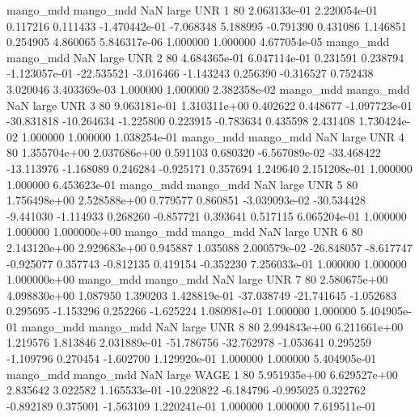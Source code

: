 mango_mdd mango_mdd                   NaN      large      UNR                 1 80 2.063133e-01   2.220054e-01      0.117216       0.111433 -1.470442e-01     -7.068348      5.188995    -0.791390       0.431086  1.146851   0.254905     4.860065   5.846317e-06            1.000000        1.000000        4.677054e-05
mango_mdd mango_mdd                   NaN      large      UNR                 2 80 4.684365e-01   6.047114e-01      0.231591       0.238794 -1.123057e-01    -22.535521     -3.016466    -1.143243       0.256390 -0.316527   0.752438     3.020046   3.403369e-03            1.000000        1.000000        2.382358e-02
mango_mdd mango_mdd                   NaN      large      UNR                 3 80 9.063181e-01   1.310311e+00      0.402622       0.448677 -1.097723e-01    -30.831818    -10.264634    -1.225800       0.223915 -0.783634   0.435598     2.431408   1.730424e-02            1.000000        1.000000        1.038254e-01
mango_mdd mango_mdd                   NaN      large      UNR                 4 80 1.355704e+00   2.037686e+00      0.591103       0.680320 -6.567089e-02    -33.468422    -13.113976    -1.168089       0.246284 -0.925171   0.357694     1.249640   2.151208e-01            1.000000        1.000000        6.453623e-01
mango_mdd mango_mdd                   NaN      large      UNR                 5 80 1.756498e+00   2.528588e+00      0.779577       0.860851 -3.039093e-02    -30.534428     -9.441030    -1.114933       0.268260 -0.857721   0.393641     0.517115   6.065204e-01            1.000000        1.000000        1.000000e+00
mango_mdd mango_mdd                   NaN      large      UNR                 6 80 2.143120e+00   2.929683e+00      0.945887       1.035088  2.000579e-02    -26.848057     -8.617747    -0.925077       0.357743 -0.812135   0.419154    -0.352230   7.256033e-01            1.000000        1.000000        1.000000e+00
mango_mdd mango_mdd                   NaN      large      UNR                 7 80 2.580675e+00   4.098830e+00      1.087950       1.390203  1.428819e-01    -37.038749    -21.741645    -1.052683       0.295695 -1.153296   0.252266    -1.625224   1.080981e-01            1.000000        1.000000        5.404905e-01
mango_mdd mango_mdd                   NaN      large      UNR                 8 80 2.994843e+00   6.211661e+00      1.219576       1.813846  2.031889e-01    -51.786756    -32.762978    -1.053641       0.295259 -1.109796   0.270454    -1.602700   1.129920e-01            1.000000        1.000000        5.404905e-01
mango_mdd mango_mdd                   NaN      large     WAGE                 1 80 5.951935e+00   6.629527e+00      2.835642       3.022582  1.165533e-01    -10.220822     -6.184796    -0.995025       0.322762 -0.892189   0.375001    -1.563109   1.220241e-01            1.000000        1.000000        7.619511e-01
